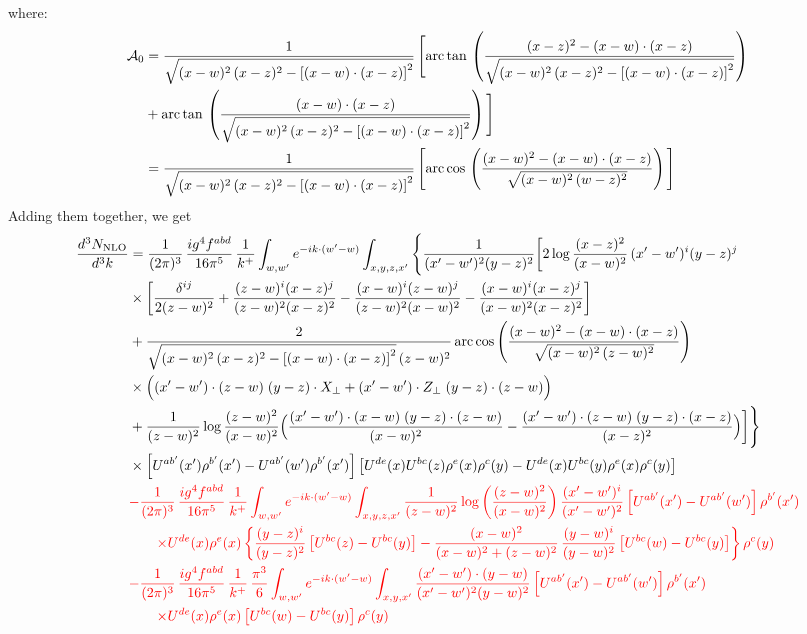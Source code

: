 \documentclass[9pt]{article}
\numberwithin{equation}{section}
\newcommand{\chg}[1]{{\color{red}#1}}
\begin{document}
where: \begin{align}
\mathcal{A}_{0} & = \frac{1}{\sqrt{(x-w)^{2}\,(x-z)^{2}-\left[(x-w)\cdot (x-z)\right]^{2}}}\, \Bigg[\mathrm{arc\,tan}\,\left(\frac{(x-z)^{2}-(x-w)\cdot (x-z)}{\sqrt{(x-w)^{2}\,(x-z)^{2}-\left[(x-w)\cdot (x-z)\right]^{2}}}\right)\notag \\ & + \mathrm{arc\,tan}\,\left(\frac{(x-w)\cdot (x-z)}{\sqrt{(x-w)^{2}\,(x-z)^{2}-\left[(x-w)\cdot (x-z)\right]^{2}}}\right) \Bigg]\notag \\ & = \frac{1}{\sqrt{(x-w)^{2}\,(x-z)^{2}-\left[(x-w)\cdot (x-z)\right]^{2}}}\, \Bigg[\mathrm{arc\,cos}\,\left(\frac{(x-w)^{2}-(x-w)\cdot (x-z)}{\sqrt{(x-w)^{2}\,(w-z)^{2}}}\right)\Bigg]
\end{align}
Adding them together, we get
\begin{align}
\frac{d^{3}N_{\rm NLO}}{d^{3}k} &=\frac{1}{(2\pi)^{3}}\,\frac{ig^{4}f^{abd}}{16\pi^{5}}\,\frac{1}{k^{+}}\int_{w,w'}e^{-ik\cdot(w'-w)}\int_{x,y,z,x'}\Bigg\{\frac{1}{(x'-w')^{2}(y-z)^{2}}\bigg[2\log\frac{(x-z)^{2}}{(x-w)^{2}}\,(x'-w')^{i}(y-z)^{j}\notag \\
& \times\bigg[\frac{\delta^{ij}}{2(z-w)^{2}}+\frac{(z-w)^{i}(x-z)^{j}}{(z-w)^{2}(x-z)^{2}}-\frac{(x-w)^{i}(z-w)^{j}}{(z-w)^{2}(x-w)^{2}}-\frac{(x-w)^{i}(x-z)^{j}}{(x-w)^{2}(x-z)^{2}}\bigg]\notag \\
& +\frac{2}{\sqrt{(x-w)^{2}\,(x-z)^{2}-\left[(x-w)\cdot (x-z)\right]^{2}}\,(z-w)^{2}}\,\mathrm{arc\,cos}\left(\frac{(x-w)^{2}-(x-w)\cdot (x-z)}{\sqrt{(x-w)^{2}\,(z-w)^{2}}}\right)\notag \\
& \times\Big((x'-w')\cdot(z-w)\;(y-z)\cdot X_{\perp}+(x'-w')\cdot Z_{\perp}\;(y-z)\cdot(z-w)\Big)\notag\\
&+\frac{1}{(z-w)^{2}}\log\frac{(z-w)^{2}}{(x-w)^{2}}\Big(\frac{(x'-w')\cdot(x-w)\;(y-z)\cdot(z-w)}{(x-w)^{2}}-\frac{(x'-w')\cdot(z-w)\;(y-z)\cdot(x-z)}{(x-z)^{2}}\Big)\bigg]\Bigg\}\notag\\
&\times\left[U^{ab'}(x')\rho^{b'}(x')-U^{ab'}(w')\rho^{b'}(x')\right]\left[U^{de}(x)U^{bc}(z)\rho^{e}(x)\rho^{c}(y)-U^{de}(x)U^{bc}(y)\rho^{e}(x)\rho^{c}(y)\right]\notag\\
&\chg{-\frac{1}{(2\pi)^{3}}\,\frac{ig^{4}f^{abd}}{16\pi^{5}}\,\frac{1}{k^{+}}\int_{w,w'}e^{-ik\cdot(w'-w)}\int_{x,y,z,x'}\frac{1}{(z-w)^{2}}\log\left(\frac{(z-w)^{2}}{(x-w)^{2}}\right)\frac{(x'-w')^{i}}{(x'-w')^{2}}\left[U^{ab'}(x')-U^{ab'}(w')\right]\rho^{b'}(x')}\notag\\
&\chg{\qquad\times U^{de}(x)\rho^{e}(x)\left\{\frac{(y-z)^{i}}{(y-z)^{2}}\left[U^{bc}(z)-U^{bc}(y)\right]-\frac{(x-w)^{2}}{(x-w)^{2}+(z-w)^{2}}\,\frac{(y-w)^{i}}{(y-w)^{2}}\left[U^{bc}(w)-U^{bc}(y)\right]\right\}\rho^{c}(y)}\notag \\
&\chg{-\frac{1}{(2\pi)^{3}}\,\frac{ig^{4}f^{abd}}{16\pi^{5}}\,\frac{1}{k^{+}}\,\frac{\pi^{3}}{6}\int_{w,w'}e^{-ik\cdot(w'-w)}\int_{x,y,x'}\frac{(x'-w')\cdot(y-w)}{(x'-w')^{2}(y-w)^{2}}\left[U^{ab'}(x')-U^{ab'}(w')\right]\rho^{b'}(x')}\notag\\
&\chg{\qquad\times U^{de}(x)\rho^{e}(x)\left[U^{bc}(w)-U^{bc}(y)\right]\rho^{c}(y)}
\end{align}
\end{document}
